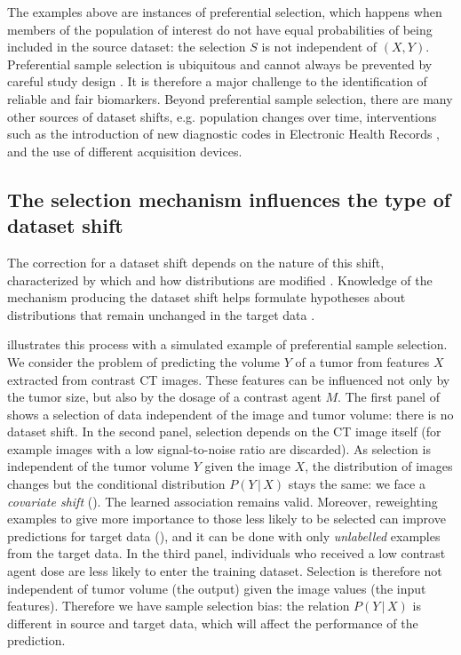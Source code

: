 \documentclass[a4paper,num-refs]{oup-contemporary}
\newcommand{\giv}{ \,|\, }
\begin{document}
The examples above are instances of preferential selection, which happens when
members of the population of interest do not have equal probabilities of being
included in the source dataset: the selection \(S\) is not independent of \((X,
Y)\).
%
Preferential sample selection is ubiquitous and cannot always be prevented by
careful study design \citep{bareinboim2012controlling}. It is therefore a major
challenge to the identification of reliable and fair biomarkers.
%
Beyond preferential sample selection, there are many other sources of dataset
shifts, e.g. population changes over time, interventions such as the
introduction of new diagnostic codes in Electronic Health Records
\citep{saez2020ehrtemporalvariability}, and the use of different acquisition
devices.
%

\subsection{The selection mechanism influences the type of dataset shift}

The correction for a dataset shift depends on the nature of this shift, 
characterized by which and how distributions are modified \citep{storkey2009training}.
%
Knowledge of the mechanism producing the dataset shift 
helps formulate hypotheses about distributions that remain unchanged in the
target data \citep[Chap. 5]{scholkopf2012causal,peters2017elements}.

 illustrates this process
with a simulated example of preferential sample selection.
We consider the problem of predicting the volume \(Y\) of a tumor from
features \(X\) extracted from contrast CT images. These features can be
influenced not only by the tumor size, but also by the dosage of a contrast
agent \(M\).
%
The first panel of  shows a selection
of data independent of the image and tumor volume: there is no dataset shift.
%
In the second panel, selection depends on the CT image itself (for example images
with a low signal-to-noise ratio are discarded). As selection is independent of
the tumor volume \(Y\) given the image \(X\), the distribution of images changes but the
conditional distribution \(P(Y \giv X)\) stays the same: we face a
\emph{covariate shift} (). The learned association
remains valid.
%
Moreover, reweighting examples to give more importance to those
less likely to be selected can improve predictions for target
data (), and
it can be done with only \emph{unlabelled} examples from the target data.
%
In the third panel, individuals who received a low contrast agent dose are less
likely to enter the training dataset. Selection is therefore not independent of
tumor volume (the output) given the image values (the input features). Therefore
we have sample selection bias: the relation \(P(Y \giv X)\) is different in
source and target data, which will affect the performance of the prediction.
%
\end{document}
